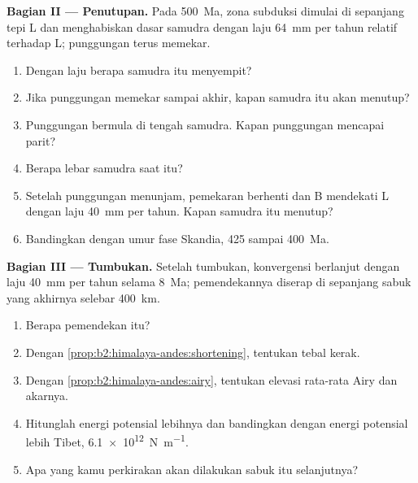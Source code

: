 \begin{problem}
\noindent\textbf{Bagian II --- Penutupan.} Pada \qty{500}{Ma}, zona subduksi dimulai di sepanjang
tepi L dan menghabiskan dasar samudra dengan laju \qty{64}{mm} per tahun relatif terhadap L; punggungan terus
memekar.
\begin{enumerate}[resume]
\item Dengan laju berapa samudra itu menyempit?
\item Jika punggungan memekar sampai akhir, kapan samudra itu akan menutup?
\item Punggungan bermula di tengah samudra. Kapan punggungan mencapai parit?
\item Berapa lebar samudra saat itu?
\item Setelah punggungan menunjam, pemekaran berhenti dan B mendekati L dengan laju \qty{40}{mm} per
tahun. Kapan samudra itu menutup?
\item Bandingkan dengan umur fase Skandia, 425 sampai \qty{400}{Ma}.
\end{enumerate}

\noindent\textbf{Bagian III --- Tumbukan.} Setelah tumbukan, konvergensi berlanjut dengan laju
\qty{40}{mm} per tahun selama \qty{8}{Ma}; pemendekannya diserap di sepanjang sabuk yang akhirnya
selebar \qty{400}{km}.
\begin{enumerate}[resume]
\item Berapa pemendekan itu?
\item Dengan \cref{prop:b2:himalaya-andes:shortening}, tentukan tebal kerak.
\item Dengan \cref{prop:b2:himalaya-andes:airy}, tentukan elevasi rata-rata Airy dan akarnya.
\item Hitunglah energi potensial lebihnya dan bandingkan dengan energi potensial lebih Tibet,
\qty{6.1e12}{N.m^{-1}}.
\item Apa yang kamu perkirakan akan dilakukan sabuk itu selanjutnya?
\end{enumerate}


\end{problem}
